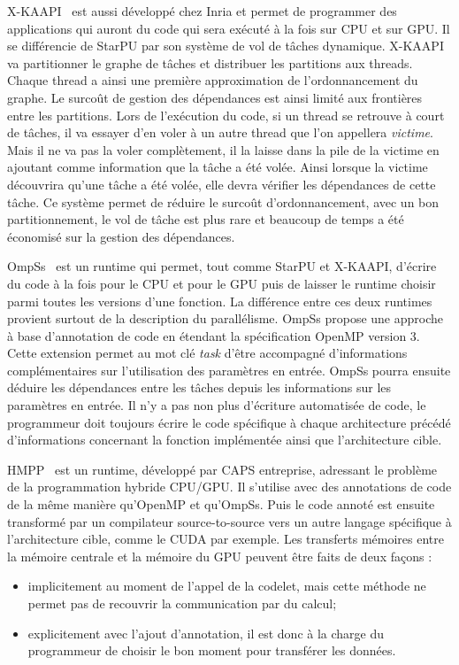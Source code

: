 X-KAAPI~\cite{xkaapi} est aussi développé chez Inria et permet de programmer des applications qui auront du code qui sera exécuté à la fois sur CPU et sur GPU.
%
Il se différencie de StarPU par son système de vol de tâches dynamique.
%
X-KAAPI va partitionner le graphe de tâches et distribuer les partitions aux threads.
%
Chaque thread a ainsi une première approximation de l'ordonnancement du graphe.
%
Le surcoût de gestion des dépendances est ainsi limité aux frontières entre les partitions.
%
Lors de l'exécution du code, si un thread se retrouve à court de tâches, il va essayer d'en voler à un autre thread que l'on appellera {\em victime}.
%
Mais il ne va pas la voler complètement, il la laisse dans la pile de la victime en ajoutant comme information que la tâche a été volée.
%
Ainsi lorsque la victime découvrira qu'une tâche a été volée, elle devra vérifier les dépendances de cette tâche.
%
Ce système permet de réduire le surcoût d'ordonnancement, avec un bon partitionnement, le vol de tâche est plus rare et beaucoup de temps a été économisé sur la gestion des dépendances.



OmpSs~\cite{OMPSs} est un runtime qui permet, tout comme StarPU et X-KAAPI, d'écrire du code à la fois pour le CPU et pour le GPU puis de laisser le runtime choisir parmi toutes les versions d'une fonction.
%
La différence entre ces deux runtimes provient surtout de la description du parallélisme.
%
OmpSs propose une approche à base d'annotation de code en étendant la spécification OpenMP version 3.
%
Cette extension permet au mot clé {\em task} d'être accompagné d'informations complémentaires sur l'utilisation des paramètres en entrée.
%
OmpSs pourra ensuite déduire les dépendances entre les tâches depuis les informations sur les paramètres en entrée.
%
Il n'y a pas non plus d'écriture automatisée de code, le programmeur doit toujours écrire le code spécifique à chaque architecture précédé d'informations concernant la fonction implémentée ainsi que l'architecture cible.



HMPP~\cite{hmpp} est un runtime, développé par CAPS entreprise, adressant le problème de la programmation hybride CPU/GPU.
%
Il s'utilise avec des annotations de code de la même manière qu'OpenMP et qu'OmpSs.
%
Puis le code annoté est ensuite transformé par un compilateur source-to-source vers un autre langage spécifique à l'architecture cible, comme le CUDA par exemple.
%
Les transferts mémoires entre la mémoire centrale et la mémoire du GPU peuvent être faits de deux façons :
\begin{itemize}
  \item implicitement au moment de l'appel de la codelet, mais cette méthode ne permet pas de recouvrir la communication par du calcul;
  \item explicitement avec l'ajout d'annotation, il est donc à la charge du programmeur de choisir le bon moment pour transférer les données.
\end{itemize}
%



